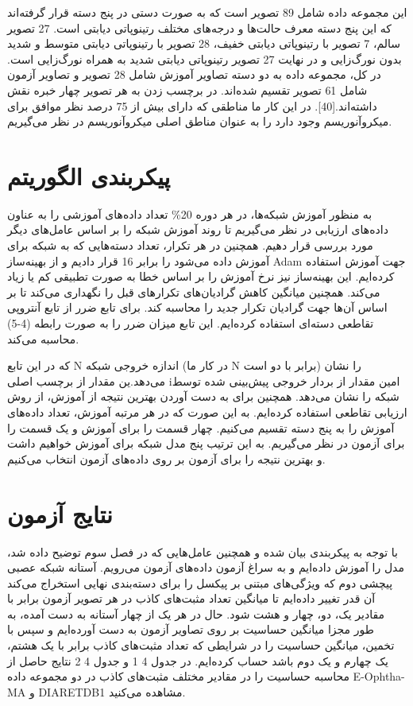 این مجموعه داده شامل 89 تصویر است که به صورت دستی در پنج دسته قرار گرفته‌اند که این پنج دسته معرف حالت‌ها و درجه‌های مختلف رتینوپاتی دیابتی است. 27 تصویر سالم، 7 تصویر با رتینوپاتی دیابتی خفیف، 
28 تصویر با رتینوپاتی دیابتی متوسط و شدید بدون نورگ‌زایی و در نهایت 27 تصویر رتینوپاتی دیابتی شدید به همراه نورگ‌‌زایی است. در کل، مجموعه داده به دو دسته تصاویر آموزش شامل 28 تصویر و تصاویر آزمون شامل 61 تصویر تقسیم شده‌اند. در برچسب زدن به هر تصویر چهار خبره نقش داشته‌اند.[40]. در این کار ما مناطقی که دارای بیش از 75 درصد نظر موافق برای میکروآنوریسم وجود دارد را به عنوان مناطق اصلی میکروآنوریسم در نظر می‌گیریم.

\section{پیکربندی الگوریتم}

به منظور آموزش شبکه‌ها، در هر دوره 20\% تعداد داد‌ه‌های آموزشی را به عناون داده‌های ارزیابی در نظر می‌گیریم تا روند آموزش شبکه را بر اساس عامل‌های دیگر مورد بررسی قرار دهیم. همچنین در هر تکرار، تعداد دسته‌هایی که به شبکه برای آموزش داده می‌شود را برابر 16 قرار دادیم و از بهینه‌ساز Adam جهت آموزش استفاده کرده‌ایم. این بهینه‌ساز نیز نرخ آموزش را بر اساس خطا به صورت تطبیقی کم یا زیاد می‌کند. همچنین میانگین کاهش گرادیان‌های تکرارهای قبل را نگهداری می‌کند تا بر اساس آن‌ها جهت گرادیان تکرار جدید را محاسبه کند. 
برای تابع ضرر از تابع آنتروپی تقاطعی دسته‌ای  استفاده کرده‌‌ایم. این تابع میزان ضرر را به صورت رابطه (4-5) محاسبه می‌کند.

که در این تابع N اندازه خروجی شبکه (در کار ما N برابر با دو است) را نشان می‌دهد.ین مقدار از برچسب اصلی  iامین مقدار از بردار خروجی پیش‌بینی شده توسط شبکه را نشان می‌دهد. 
همچنین برای به دست آوردن بهترین نتیجه از آموزش، از روش ارزیابی تقاطعی استفاده کرده‌ایم. به این صورت که در هر مرتبه آموزش، تعداد داده‌های آموزش را به پنج دسته تقسیم می‌کنیم. چهار قسمت را برای آموزش و یک قسمت را برای آزمون در نظر می‌گیریم. به این ترتیب پنج مدل شبکه برای آموزش خواهیم داشت و بهترین نتیجه را برای آزمون بر روی داده‌های آزمون انتخاب می‌کنیم.

\section{نتایج آزمون}
با توجه به پیکربندی بیان شده و همچنین عامل‌هایی که در فصل سوم توضیح داده شد، مدل را آموزش داده‌ایم و به سراغ آزمون داده‌های آزمون می‌رویم. آستانه شبکه عصبی پیچشی دوم که ویژگی‌های مبتنی بر پیکسل را برای دسته‌بندی نهایی استخراج می‌کند آن قدر تغییر داده‌ایم تا میانگین تعداد مثبت‌های کاذب در هر تصویر آزمون برابر با مقادیر یک، دو، چهار و هشت شود.
حال در هر یک از چهار آستانه به دست آمده، به طور مجزا میانگین حساسیت بر روی تصاویر آزمون به دست آورده‌ایم و سپس با تخمین، میانگین حساسیت را در شرایطی که تعداد مثبت‌های کاذب برابر با یک هشتم، یک چهارم و یک دوم باشد حساب کرده‌ایم. در جدول ‏4 1 و جدول ‏4 2 نتایج حاصل از محاسبه حساسیت را در مقادیر مختلف مثبت‌های کاذب در دو مجموعه داده E-Ophtha-MA و DIARETDB1 مشاهده می‌کنید.

